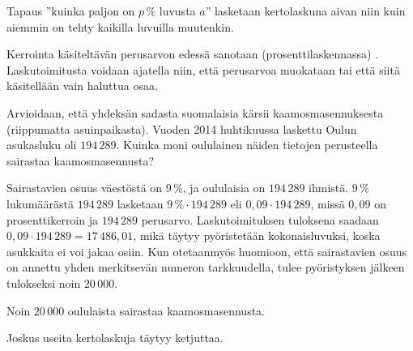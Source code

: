 Tapaus ''kuinka paljon on $p$\,\% luvusta $a$'' lasketaan kertolaskuna aivan niin kuin aiemmin on tehty kaikilla luvuilla muutenkin.

\begin{esimerkki}
\end{esimerkki}

Kerrointa käsiteltävän perusarvon edessä sanotaan (prosenttilaskennassa) . Laskutoimitusta voidaan ajatella niin, että perusarvoa muokataan tai että siitä käsitellään vain haluttua osaa.

\begin{esimerkki}
Arvioidaan, että yhdeksän sadasta suomalaisia kärsii kaamosmasennuksesta (riippumatta asuinpaikasta). Vuoden 2014 huhtikuussa laskettu Oulun asukasluku oli $194\,289$. Kuinka moni oululainen näiden tietojen perusteella sairastaa kaamosmasennusta?
	\begin{esimratk}
	Sairastavien osuus väestöstä on $9$\,\%, ja oululaisia on $194\,289$ ihmistä. $9\,\%$ lukumäärästä $194\,289$ lasketaan $9\,\% \cdot 194\,289$ eli $0,09\cdot 194\,289$, missä $0,09$ on prosenttikerroin ja $194\,289$ perusarvo. Laskutoimituksen tuloksena saadaan $0,09\cdot 194\,289=17\,486,01$, mikä täytyy pyöristetään kokonaisluvuksi, koska asukkaita ei voi jakaa osiin. Kun otetaanmyös huomioon, että sairastavien osuus on annettu yhden merkitsevän numeron tarkkuudella, tulee pyöristyksen jälkeen tulokseksi noin $20\,000$.
	\end{esimratk}
	\begin{esimvast}
	Noin $20\,000$ oululaista sairastaa kaamosmasennusta.
	\end{esimvast}
\end{esimerkki} %


Joskus useita kertolaskuja täytyy ketjuttaa.

%

